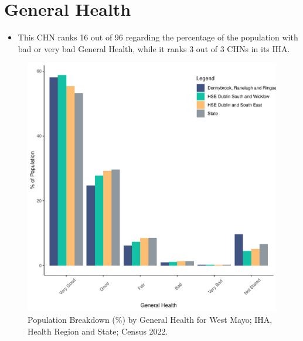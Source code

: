\documentclass{article}
\begin{document}
\pagebreak

\section{General Health}\label{sect:GenHealth}
\begin{itemize}
\item  This CHN ranks  16 out of 96 regarding the percentage of the population with bad or very bad General Health, while it ranks   3 out of 3 CHNs in its IHA.
\end{itemize}
\begin{figure}[h]
	\centering
	\includegraphics[width = 150mm]{../figures/GenED.pdf}
	\caption{Population Breakdown (\%) by General Health for West Mayo; IHA, Health Region and State;  Census 2022.}
	\label{fig:2ae19629-1a6a-13a3-e055-000000000001}
	\end{figure}
\end{document}
